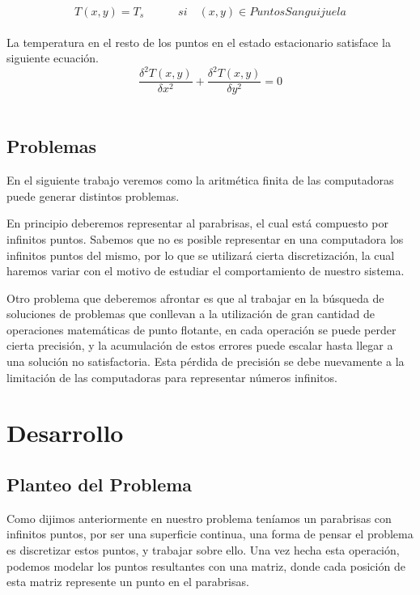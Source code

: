 \documentclass{article}
\begin{document}
\begin{equation}
T(x,y)=T_s	\quad	\quad	\quad si \quad (x,y)\in PuntosSanguijuela
\end{equation}\\




La temperatura en el resto de los puntos en el estado estacionario satisface la siguiente ecuación.\\

\begin{equation}
\frac{\delta ^2 T(x,y)}{\delta x^2}+\frac{\delta ^2 T(x,y)}{\delta y^2}=0 
\end{equation}\\





\subsection{Problemas}

En el siguiente trabajo veremos como la aritmética finita de las computadoras puede generar distintos problemas.

En principio deberemos representar al parabrisas, el cual está compuesto por infinitos puntos. Sabemos que no es posible representar en una computadora los infinitos puntos del mismo, por lo que se utilizará cierta discretización, la cual haremos variar con el motivo de estudiar el comportamiento de nuestro sistema.

Otro problema que deberemos afrontar es que al trabajar en la búsqueda de soluciones de problemas que conllevan a la utilización de gran cantidad de operaciones matemáticas de punto flotante, en cada operación se puede perder cierta precisión, y la acumulación de estos errores puede escalar hasta llegar a una solución no satisfactoria. Esta pérdida de precisión se debe nuevamente a la limitación de las computadoras para representar números infinitos.



\section{Desarrollo}

\subsection{Planteo del Problema}
Como dijimos anteriormente en nuestro problema teníamos un parabrisas con infinitos puntos, por ser una superficie continua, una forma de pensar el problema es discretizar estos puntos, y trabajar sobre ello. Una vez hecha esta operación, podemos modelar los puntos resultantes con una matriz, donde cada posición de esta matriz represente un punto en el parabrisas.
\end{document}
